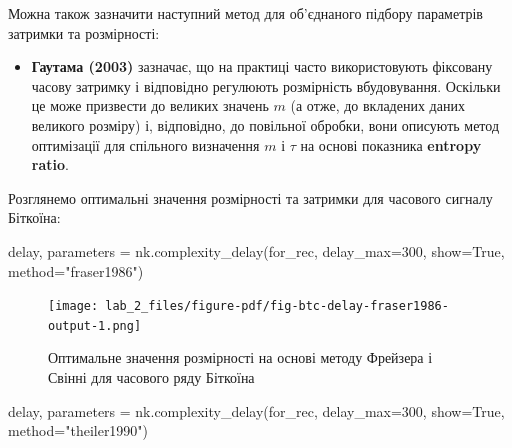 \documentclass[
  letterpaper,
]{report}
\newenvironment{Shaded}{\begin{snugshade}}{\end{snugshade}}
\newcommand{\DecValTok}[1]{\textcolor[rgb]{0.68,0.00,0.00}{#1}}
\newcommand{\NormalTok}[1]{\textcolor[rgb]{0.00,0.23,0.31}{#1}}
\newcommand{\OperatorTok}[1]{\textcolor[rgb]{0.37,0.37,0.37}{#1}}
\newcommand{\StringTok}[1]{\textcolor[rgb]{0.13,0.47,0.30}{#1}}
\newcommand{\VariableTok}[1]{\textcolor[rgb]{0.07,0.07,0.07}{#1}}
\providecommand{\tightlist}{%
  \setlength{\itemsep}{0pt}\setlength{\parskip}{0pt}}\usepackage{longtable,booktabs,array}
\begin{document}
Можна також зазначити наступний метод для об'єднаного підбору параметрів
затримки та розмірності:

\begin{itemize}
\tightlist
\item
  \textbf{Гаутама (2003)} зазначає, що на практиці часто використовують
  фіксовану часову затримку і відповідно регулюють розмірність
  вбудовування. Оскільки це може призвести до великих значень \(m\) (а
  отже, до вкладених даних великого розміру) і, відповідно, до повільної
  обробки, вони описують метод оптимізації для спільного визначення
  \(m\) і \(\tau\) на основі показника \textbf{entropy ratio}.
\end{itemize}

Розглянемо оптимальні значення розмірності та затримки для часового
сигналу Біткоїна:

\begin{Shaded}
\begin{Highlighting}[]
\NormalTok{delay, parameters }\OperatorTok{=}\NormalTok{ nk.complexity\_delay(for\_rec, }
\NormalTok{                                        delay\_max}\OperatorTok{=}\DecValTok{300}\NormalTok{, show}\OperatorTok{=}\VariableTok{True}\NormalTok{,}
\NormalTok{                                        method}\OperatorTok{=}\StringTok{"fraser1986"}\NormalTok{)}
\end{Highlighting}
\end{Shaded}

\begin{figure}[H]

{\centering \texttt{[image: lab\_2\_files/figure-pdf/fig-btc-delay-fraser1986-output-1.png]}

}

\caption{\label{fig-btc-delay-fraser1986}Оптимальне значення розмірності
на основі методу Фрейзера і Свінні для часового ряду Біткоїна}

\end{figure}

\begin{Shaded}
\begin{Highlighting}[]
\NormalTok{delay, parameters }\OperatorTok{=}\NormalTok{ nk.complexity\_delay(for\_rec, }
\NormalTok{                                        delay\_max}\OperatorTok{=}\DecValTok{300}\NormalTok{, show}\OperatorTok{=}\VariableTok{True}\NormalTok{,}
\NormalTok{                                        method}\OperatorTok{=}\StringTok{"theiler1990"}\NormalTok{)}
\end{Highlighting}
\end{Shaded}
\end{document}
